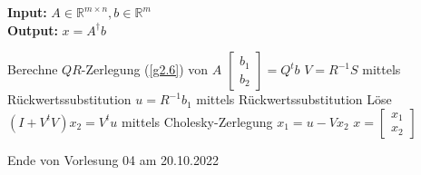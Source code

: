 \documentclass{book}
\def\R{\mathbb{R}}
\begin{document}
        \begin{algorithm}[H]\label{a2.26}
            \caption{}
            \textbf{Input:} $A\in\R^{m\times n},b\in\R^m$\\
            \textbf{Output:} $x=A^\dagger b$
            \begin{algorithmic}
            \State Berechne $QR$-Zerlegung (\ref{g2.6}) von $A$
            \State $\begin{bmatrix}b_1\\b_2\end{bmatrix}=Q^t b$
            \State $V=R^{-1}S$ mittels Rückwertssubstitution 
            \State $u=R^{-1}b_1$ mittels Rückwertssubstitution
            \State Löse $(I+V^tV)x_2=V^tu$ mittels Cholesky-Zerlegung 
            \State $x_1=u-Vx_2$
            \State $x=\begin{bmatrix}x_1\\x_2\end{bmatrix}$
            \end{algorithmic}
        \end{algorithm}

        \noindent
        \xrfill[0.7ex]{1pt}Ende von Vorlesung 04 am 20.10.2022\xrfill[0.7ex]{1pt}
        
\end{document}
